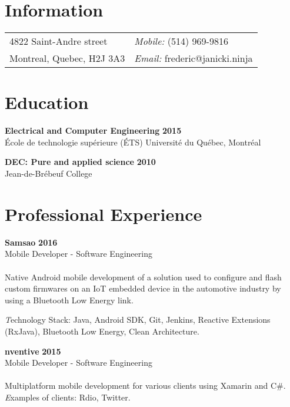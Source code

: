 \documentclass[margin,line]{res}
\begin{document}

\begin{resume}
\section{\sc Information}
\vspace{.05in}
\begin{tabular}{@{}p{2in}p{4in}}
4822 Saint-Andre street& {\it Mobile:}  (514) 969-9816 \\            
Montreal, Quebec, H2J 3A3 &{\it Email:} frederic@janicki.ninja\\      
\end{tabular}



\section{\sc Education}
{\bf Electrical and Computer Engineering} \hfill {\bf 2015}\\
École de technologie supérieure (ÉTS)
Université du Québec, Montréal


{\bf DEC: Pure and applied science} \hfill {\bf 2010}\\
Jean-de-Brébeuf College


\section{\sc Professional Experience}
{\bf Samsao} \hfill {\bf 2016}\\
Mobile Developer - Software Engineering\\\\
Native Android mobile development of a solution used to configure and flash custom firmwares on an IoT embedded device in the automotive industry by using a Bluetooth Low Energy link.

{\emph Technology Stack:} Java, Android SDK, Git, Jenkins, Reactive Extensions (RxJava), Bluetooth Low Energy, Clean Architecture.

{\bf nventive} \hfill {\bf 2015}\\
Mobile Developer - Software Engineering\\\\
Multiplatform mobile development for various clients using Xamarin and C\#.
{\emph Examples of clients:} Rdio, Twitter.


\end{resume}
\end{document}

